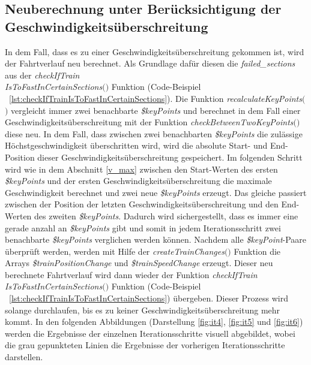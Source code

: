 \subsection{Neuberechnung unter Berücksichtigung der\\Geschwindigkeitsüberschreitung}  \label{neuberechnung}

In dem Fall, dass es zu einer Geschwindigkeitsüberschreitung gekommen ist, wird der Fahrtverlauf neu berechnet. Als Grundlage dafür diesen die \textit{\grqq{}failed\_sections\grqq{}} aus der \textit{checkIfTrain\\IsToFastInCertainSections$($$)$} Funktion (Code-Beispiel ~\ref{lst:checkIfTrainIsToFastInCertainSections}). Die Funktion \textit{recalculateKeyPoints$($$)$} vergleicht immer zwei benachbarte \textit{\$keyPoints} und berechnet in dem Fall einer Geschwindigkeitsüberschreitung mit der Funktion \textit{checkBetweenTwoKeyPoints$($$)$} diese neu. In dem Fall, dass zwischen zwei benachbarten \textit{\$keyPoints} die zulässige Höchstgeschwindigkeit überschritten wird, wird die absolute Start- und End-Position dieser Geschwindigkeitsüberschreitung gespeichert. Im folgenden Schritt wird wie in dem Abschnitt \ref{v_max} zwischen den Start-Werten des ersten \textit{\$keyPoints} und der ersten Geschwindigkeitsüberschreitung die maximale Geschwindigkeit berechnet und zwei neue \textit{\$keyPoints} erzeugt. Das gleiche passiert zwischen der Position der letzten Geschwindigkeitsüberschreitung und den End-Werten des zweiten \textit{\$keyPoints}. Dadurch wird sichergestellt, dass es immer eine gerade anzahl an \textit{\$keyPoints} gibt und somit in jedem Iterationsschritt zwei benachbarte \textit{\$keyPoints} verglichen werden können. Nachdem alle \textit{\$keyPoint}-Paare überprüft werden, werden mit Hilfe der \textit{createTrainChanges$($$)$} Funktion die Arrays \textit{\$trainPositionChange} und \textit{\$trainSpeedChange} erzeugt. Dieser neu berechnete Fahrtverlauf wird dann wieder der Funktion \textit{checkIfTrain\\IsToFastInCertainSections$($$)$} Funktion (Code-Beispiel ~\ref{lst:checkIfTrainIsToFastInCertainSections}) übergeben. Dieser Prozess wird solange durchlaufen, bis es zu keiner Geschwindigkeitsüberschreitung mehr kommt. In den folgenden Abbildungen (Darstellung \ref{fig:it4}, \ref{fig:it5} und \ref{fig:it6}) werden die Ergebnisse der einzelnen Iterationsschritte visuell abgebildet, wobei die grau gepunkteten Linien die Ergebnisse der vorherigen Iterationsschritte darstellen.

